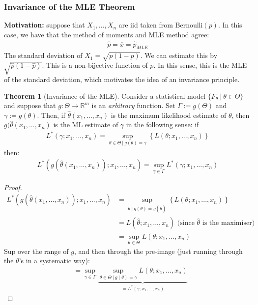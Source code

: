 \documentclass[11pt]{scrartcl}
\newcommand{\R}[0]{\mathbb{R}}
\theoremstyle{definition}
\newtheorem{theorem}{Theorem}
\theoremstyle{remark}
\begin{document}
{\subsubsection{Invariance of the MLE Theorem}
\textbf{Motivation:} suppose that $X_1, ..., X_n$ are iid taken from Bernoulli$(p)$. In this case, we have that the method of moments and MLE method agree: 
\begin{align*}
	\hat{p} = \overline{x} = \hat{p}_{MLE} 	
\end{align*}
The standard deviation of $X_1 = \sqrt{ p (1-p)}$. We can estimate this by $\sqrt{\hat{p}(1-\hat{p})}$. This is a non-bijective function of $p$. In this sense, this is the MLE of the standard deviation, which motivates the idea of an invariance principle. 

\begin{theorem}[Invariance of the MLE]
	Consider a statistical model $\{ F_\theta\ |\ \theta \in \Theta \}$ and suppose that $g: \Theta \rightarrow \R^m$ is an \emph{arbitrary} function. Set $\Gamma := g(\Theta)$ and $\gamma := g (\theta)$. Then, if $\hat{\theta}(x_1, ..., x_n)$ is the maximum likelihood estimate of $\theta$, then $g(\hat{\theta}(x_1,..., x_n ) $ is the ML estimate of $\gamma$ in the following sense: if 
	\begin{align}
		L^*(\gamma; x_1, ... , x_n ) = \sup_{\theta \in \Theta\ |\ g(\theta) = \gamma } \left\{ L(\theta; x_1, ..., x_n)	\right\} 
	\end{align}
	then: 
	\begin{align}
		L^*(g(\hat{\theta}(x_1,..., x_n)); x_1,..., x_n) = \sup_{\gamma \in \Gamma} L^*(\gamma; x_1, ..., x_n ) 	
	\end{align}
\end{theorem}

\begin{proof}
	\begin{align*}
	L^*(g(\hat{\theta} (x_1, ..., x_n)); x_1, ..., x_n ) & = \sup_{\theta\ |\ g(\theta) = g (\hat{\theta}) } \left\{ 	L(\theta; x_1, ..., x_n )	\right\} 	\\
		& = L(\hat{\theta}; x_1, ..., x_n ) \text{ (since $\hat{\theta}$ is the maximiser)} \\
		& = \sup_{\theta \in \Theta} L(\theta; x_1, ..., x_n) 
	\end{align*}
	Sup over the range of $g$, and then through the pre-image (just running through the $\theta$'s in a systematic way):
	\begin{align*}
		& = \sup_{\gamma \in \Gamma} \underbrace{\sup_{\theta \in \Theta\ |\ g(\theta) = \gamma } L(\theta; x_1, ..., x_n ) }_{=L^*(\gamma; x_1, ..., x_n)}	
	\end{align*}
\end{proof}

}
\end{document}
